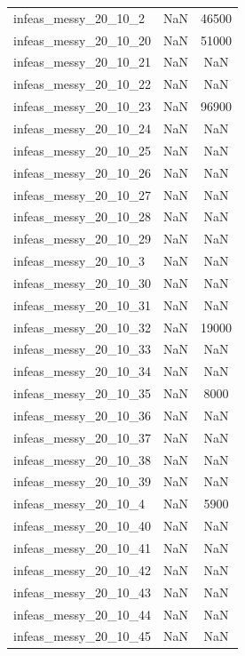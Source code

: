 \begin{longtable}{lcc}
infeas\_messy\_20\_10\_2   &      NaN &  46500 \\
infeas\_messy\_20\_10\_20  &      NaN &  51000 \\
infeas\_messy\_20\_10\_21  &      NaN &    NaN \\
infeas\_messy\_20\_10\_22  &      NaN &    NaN \\
infeas\_messy\_20\_10\_23  &      NaN &  96900 \\
infeas\_messy\_20\_10\_24  &      NaN &    NaN \\
infeas\_messy\_20\_10\_25  &      NaN &    NaN \\
infeas\_messy\_20\_10\_26  &      NaN &    NaN \\
infeas\_messy\_20\_10\_27  &      NaN &    NaN \\
infeas\_messy\_20\_10\_28  &      NaN &    NaN \\
infeas\_messy\_20\_10\_29  &      NaN &    NaN \\
infeas\_messy\_20\_10\_3   &      NaN &    NaN \\
infeas\_messy\_20\_10\_30  &      NaN &    NaN \\
infeas\_messy\_20\_10\_31  &      NaN &    NaN \\
infeas\_messy\_20\_10\_32  &      NaN &  19000 \\
infeas\_messy\_20\_10\_33  &      NaN &    NaN \\
infeas\_messy\_20\_10\_34  &      NaN &    NaN \\
infeas\_messy\_20\_10\_35  &      NaN &   8000 \\
infeas\_messy\_20\_10\_36  &      NaN &    NaN \\
infeas\_messy\_20\_10\_37  &      NaN &    NaN \\
infeas\_messy\_20\_10\_38  &      NaN &    NaN \\
infeas\_messy\_20\_10\_39  &      NaN &    NaN \\
infeas\_messy\_20\_10\_4   &      NaN &   5900 \\
infeas\_messy\_20\_10\_40  &      NaN &    NaN \\
infeas\_messy\_20\_10\_41  &      NaN &    NaN \\
infeas\_messy\_20\_10\_42  &      NaN &    NaN \\
infeas\_messy\_20\_10\_43  &      NaN &    NaN \\
infeas\_messy\_20\_10\_44  &      NaN &    NaN \\
infeas\_messy\_20\_10\_45  &      NaN &    NaN \\

\end{longtable}
